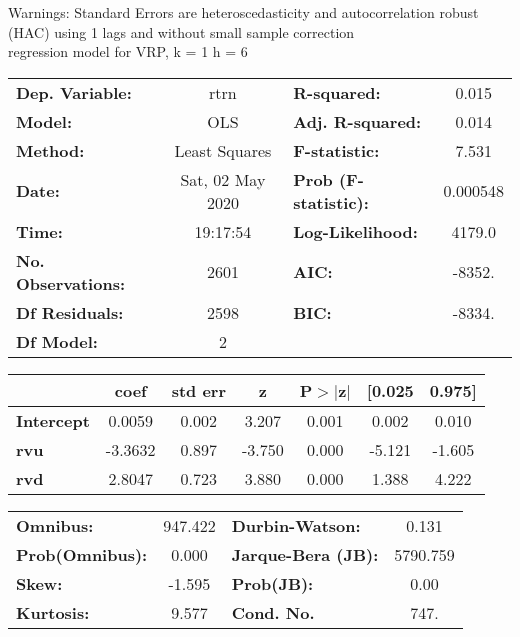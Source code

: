 Warnings: \newline
 [1] Standard Errors are heteroscedasticity and autocorrelation robust (HAC) using 1 lags and without small sample correction\\ 

regression model for VRP, k = 1 h = 6\begin{center}
\begin{tabular}{lclc}
\toprule
\textbf{Dep. Variable:}    &       rtrn       & \textbf{  R-squared:         } &     0.015   \\
\textbf{Model:}            &       OLS        & \textbf{  Adj. R-squared:    } &     0.014   \\
\textbf{Method:}           &  Least Squares   & \textbf{  F-statistic:       } &     7.531   \\
\textbf{Date:}             & Sat, 02 May 2020 & \textbf{  Prob (F-statistic):} &  0.000548   \\
\textbf{Time:}             &     19:17:54     & \textbf{  Log-Likelihood:    } &    4179.0   \\
\textbf{No. Observations:} &        2601      & \textbf{  AIC:               } &    -8352.   \\
\textbf{Df Residuals:}     &        2598      & \textbf{  BIC:               } &    -8334.   \\
\textbf{Df Model:}         &           2      & \textbf{                     } &             \\
\bottomrule
\end{tabular}
\begin{tabular}{lcccccc}
                   & \textbf{coef} & \textbf{std err} & \textbf{z} & \textbf{P$> |$z$|$} & \textbf{[0.025} & \textbf{0.975]}  \\
\midrule
\textbf{Intercept} &       0.0059  &        0.002     &     3.207  &         0.001        &        0.002    &        0.010     \\
\textbf{rvu}       &      -3.3632  &        0.897     &    -3.750  &         0.000        &       -5.121    &       -1.605     \\
\textbf{rvd}       &       2.8047  &        0.723     &     3.880  &         0.000        &        1.388    &        4.222     \\
\bottomrule
\end{tabular}
\begin{tabular}{lclc}
\textbf{Omnibus:}       & 947.422 & \textbf{  Durbin-Watson:     } &    0.131  \\
\textbf{Prob(Omnibus):} &   0.000 & \textbf{  Jarque-Bera (JB):  } & 5790.759  \\
\textbf{Skew:}          &  -1.595 & \textbf{  Prob(JB):          } &     0.00  \\
\textbf{Kurtosis:}      &   9.577 & \textbf{  Cond. No.          } &     747.  \\
\bottomrule
\end{tabular}
\end{center}

